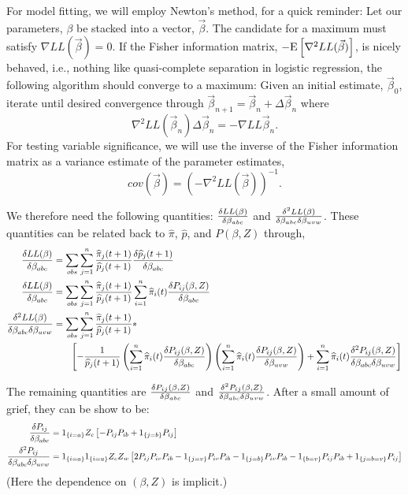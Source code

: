 \documentclass[10pt]{article}
\begin{document}
For model fitting, we will employ Newton's method, for a quick reminder:  Let our parameters, $\beta$ be stacked into a vector, $\vec{\beta}$.
The candidate for a maximum must satisfy $\nabla LL(\vec{\beta})=0$.  If the Fisher information matrix, $-\text{E}\left[{\nabla^2 LL(\vec{\beta})}\right]$, is 
nicely behaved, i.e., nothing like quasi-complete separation in logistic regression, the following algorithm should converge to a maximum: Given an initial
estimate, $\vec{\beta}_0$, iterate until desired convergence through $\vec{\beta}_{n+1}=\vec{\beta}_n+\Delta\vec{\beta}_n$ where
$$\nabla^2LL(\vec{\beta}_n)\Delta\vec{\beta}_n=-\nabla LL\vec{\beta}_n.$$
For testing variable significance, we will use the inverse of the Fisher information matrix as a variance estimate of the parameter estimates,
$$cov(\vec{\beta})=(-\nabla^2LL(\vec{\beta}))^{-1}.$$

We therefore need the following quantities: ${\delta LL(\beta)\over \delta \beta_{abc}}$ and ${\delta^2 LL(\beta)\over \delta \beta_{abc}\delta \beta_{uvw}}$.
These quantities can be related back to $\widehat{\pi}$, $\widehat{p}$, and $P(\beta, Z)$ through,
\begin{align*}
{\delta LL(\beta)\over \delta \beta_{abc}}&=\sum_{obs} \sum_{j=1}^n {\widehat{\pi}_j(t+1)\over \widehat{p}_j(t+1)}{\delta \widehat{p}_j(t+1)\over \delta \beta_{abc}} \\
{\delta LL(\beta)\over \delta \beta_{abc}}&=\sum_{obs} \sum_{j=1}^n {\widehat{\pi}_j(t+1)\over \widehat{p}_j(t+1)}\sum_{i=1}^n \widehat{\pi}_i(t){\delta P_{ij}(\beta,Z) \over \delta \beta_{abc}} \\
{\delta^2 LL(\beta)\over \delta \beta_{abc}\delta \beta_{uvw}}&=
	\sum_{obs} \sum_{j=1}^n {\widehat{\pi}_j(t+1)\over \widehat{p}_j(t+1)}* \\
&\hspace{.25in} \left[{
			-{1\over \widehat{p}_j(t+1)}\left({\sum_{i=1}^n\widehat{\pi}_i(t){\delta P_{ij}(\beta,Z) \over \delta \beta_{abc}}}\right)
			\left({\sum_{i=1}^n\widehat{\pi}_i(t){\delta P_{ij}(\beta,Z) \over \delta \beta_{uvw}}}\right)
			+\sum_{i=1}^n\widehat{\pi}_i(t){\delta^2 P_{ij}(\beta,Z) \over \delta \beta_{abc} \delta \beta_{uvw}}
			}\right] 
\end{align*}

The remaining quantities are ${\delta P_{ij}(\beta,Z) \over \delta \beta_{abc}}$ and ${\delta^2 P_{ij}(\beta,Z) \over \delta \beta_{abc} \delta \beta_{uvw}}$. After a small amount of grief, they 
can be show to be:
\begin{align*}
{\delta P_{ij}\over \delta \beta_{abc}}&=1_{\{i=a\}}Z_c\left[{ -P_{ij}P_{ib} + 1_{\{j=b\}}P_{ij}}\right] \\
{\delta^2 P_{ij} \over \delta \beta_{abc} \delta \beta_{uvw}}&=1_{\{i=a\}}1_{\{i=u\}}Z_cZ_w\left[{2P_{ij}P_{iv}P_{ib} -1_{\{j=v\}}P_{iv}P_{ib}-1_{\{j=b\}}P_{iv}P_{ib}-1_{\{b=v\}}P_{ij}P_{ib}
+1_{\{j=b=v\}}P_{ij}}\right]
\end{align*}
(Here the dependence on $(\beta, Z)$ is implicit.)
\end{document}
